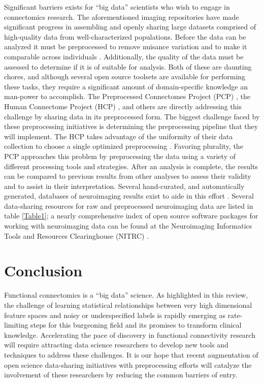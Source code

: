 \documentclass{bmcart}
\begin{document}
Significant barriers exists for ``big data'' scientists who wish to engage in connectomics research. The aforementioned imaging repositories have made significant progress in assembling and openly sharing large datasets comprised of high-quality data from well-characterized populations. Before the data can be analyzed it must be preprocessed to remove nuisance variation and to make it comparable across individuals \cite{strother2006}. Additionally, the quality of the data must be assessed to determine if it is of suitable for analysis. Both of these are daunting chores, and although several open source toolsets are available for performing these tasks, they require a significant amount of domain-specific knowledge an man-power to accomplish. The Preprocessed Connectomes Project (PCP) \cite{CraddockPCP}, the Human Connectome Project (HCP) \cite{RosenHCP2010,VanEssen2012}, and others are directly addressing this challenge by sharing data in its preprocessed form. The biggest challenge faced by these preprocessing initiatives is determining the preprocessing pipeline that they will implement. The HCP takes advantage of the uniformity of their data collection to choose a single optimized preprocessing \cite{Glasser2013}. Favoring plurality, the PCP approaches this problem by preprocessing the data using a variety of different processing tools and strategies. After an analysis is complete, the results can be compared to previous results from other analyses to assess their validity and to assist in their interpretation. Several hand-curated, and automatically generated, databases of neuroimaging results exist to aide in this effort \cite{Fox2002, Yarkoni2011, Neurovault, Brainspell}. Several data-sharing resources for raw and preprocessed neuroimaging data are listed in table \ref{Table1}; a nearly comprehensive index of open source software packages for working with neuroimaging data can be found at the Neuroimaging Informatics Tools and Resources Clearinghouse (NITRC) \cite{NITRC}. 


\section {Conclusion}
Functional connectomics is a ``big data'' science. As highlighted in this review, the challenge of learning statistical relationships between very high dimensional feature spaces and noisy or underspecified labels is rapidly emerging as rate-limiting steps for this burgeoning field and its promises to transform clinical knowledge. Accelerating the pace of discovery in functional connectivity research will require attracting data science researchers to develop new tools and techniques to address these challenges. It is our hope that recent augmentation of open science data-sharing initiatives with preprocessing efforts will catalyze the involvement of these researchers by reducing the common barriers of entry. 
\end{document}
